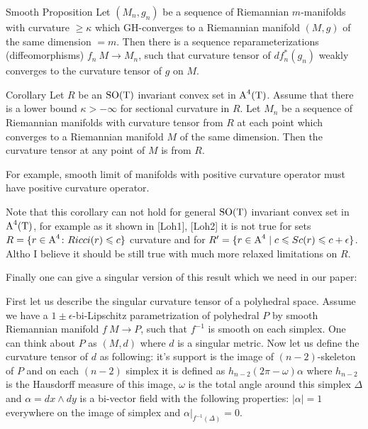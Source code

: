 \documentclass{article}
\begin{document}
\begin{thm}{Smooth Proposition} Let $(M_n,g_n)$ be a sequence of
Riemannian $m$-manifolds with curvature $\ge \kappa$ which
GH-converges to a Riemannian manifold $(M,g)$ of the same
dimension $=m$. Then there is a sequence reparameterizations
(diffeomorphisms) $f_n\:M\to M_n$, such that curvature tensor of
$df_n^*(g_n)$ weakly converges to the curvature tensor of $g$ on
$M$.
\end{thm}


\begin{thm}{Corollary} Let $R$ be an $\text{\rm SO}(\text{\rm T})$ invariant convex set in $\text{\rm A}^4(\text{\rm T})$. Assume
that there is a lower bound $\kappa>-\infty$ for sectional curvature in $R$.
Let $M_n$ be a sequence of Riemannian manifolds with curvature tensor from $R$ at each point which converges to a Riemannian manifold $M$ of the same dimension. Then the curvature tensor at any point of $M$ is from $R$.
\end{thm}


For example, smooth limit of manifolds with positive curvature
operator must have positive curvature operator.

 Note that this corollary can not hold for general
$\text{\rm SO}(\text{\rm T})$ invariant convex set in $\text{\rm A}^4(\text{\rm T})$, for example as it shown
in [Loh1], [Loh2] it is not true for sets $R=\{r\in
\text{\rm A}^4\colon Ricci(r)\leqslant c\}$ curvature and for $R'=\{r\in \text{\rm A}^4\mid c\leqslant
Sc(r)\leqslant c+\epsilon\}$.
Altho I believe it should be still true
with much more relaxed limitations on $R$.




Finally one can give a singular version of this result which we need in our paper:

First let us describe the singular curvature tensor of a polyhedral space. 
Assume
we have a $1\pm\epsilon$-bi-Lipschitz parametrization of polyhedral $P$
by smooth
Riemannian manifold $f\:M\to P$, such that $f^{-1}$ is smooth on each simplex.
One can think about $P$ as $(M,d)$ where $d$ is a singular metric.
Now let us define the curvature tensor of $d$ as following: it's support is the
 image of $(n-2)$-skeleton of $P$ and on each $(n-2)$ simplex it is defined as
$h_{n-2}(2\pi-\omega)\alpha$ where $h_{n-2}$ is the Hausdorff
measure of this image, $\omega$ is the total angle around this
simplex $\Delta$ and $\alpha=dx\wedge dy$ is a bi-vector field
with the following properties: $|\alpha|=1$ everywhere on the
image of simplex and $\alpha|_{f^{-1}(\Delta)}=0$.
\end{document}
